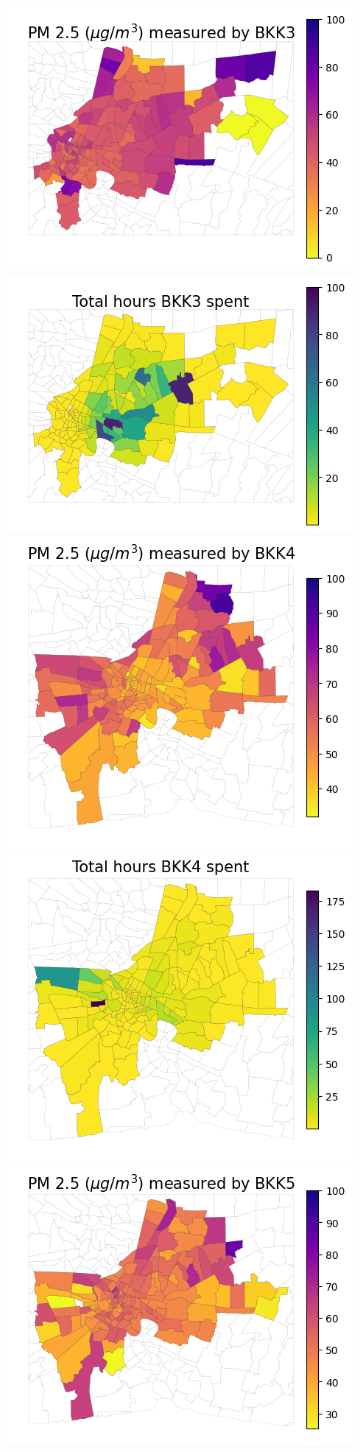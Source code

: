 \begin{figure}
\begin{subfigure}[t]{0.49\textwidth}
        \includegraphics[width=.49\linewidth]{figures/map/BKK3_PM25.png}%
        \includegraphics[width=.49\linewidth]{figures/map/BKK3_time.png}
        \includegraphics[width=.49\linewidth]{figures/map/BKK4_PM25.png}%
        \includegraphics[width=.49\linewidth]{figures/map/BKK4_time.png}
        \includegraphics[width=.49\linewidth]{figures/map/BKK5_PM25.png}%

\end{subfigure}
\end{figure}
